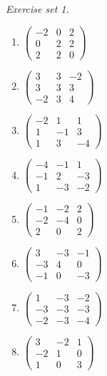 \par\noindent\emph{Exercise set 1.}\nopagebreak
\begin{enumerate}[label=\arabic*., leftmargin=*, itemsep=1pt]
\item $\left(\begin{smallmatrix}-2 & 0 & 2\\ 0 & 2 & 2\\ 2 & 2 & 0\end{smallmatrix}\right)$
\item $\left(\begin{smallmatrix}3 & 3 & -2\\ 3 & 3 & 3\\ -2 & 3 & 4\end{smallmatrix}\right)$
\item $\left(\begin{smallmatrix}-2 & 1 & 1\\ 1 & -1 & 3\\ 1 & 3 & -4\end{smallmatrix}\right)$
\item $\left(\begin{smallmatrix}-4 & -1 & 1\\ -1 & 2 & -3\\ 1 & -3 & -2\end{smallmatrix}\right)$
\item $\left(\begin{smallmatrix}-1 & -2 & 2\\ -2 & -4 & 0\\ 2 & 0 & 2\end{smallmatrix}\right)$
\item $\left(\begin{smallmatrix}3 & -3 & -1\\ -3 & 4 & 0\\ -1 & 0 & -3\end{smallmatrix}\right)$
\item $\left(\begin{smallmatrix}1 & -3 & -2\\ -3 & -3 & -3\\ -2 & -3 & -4\end{smallmatrix}\right)$
\item $\left(\begin{smallmatrix}3 & -2 & 1\\ -2 & 1 & 0\\ 1 & 0 & 3\end{smallmatrix}\right)$

\end{enumerate}
